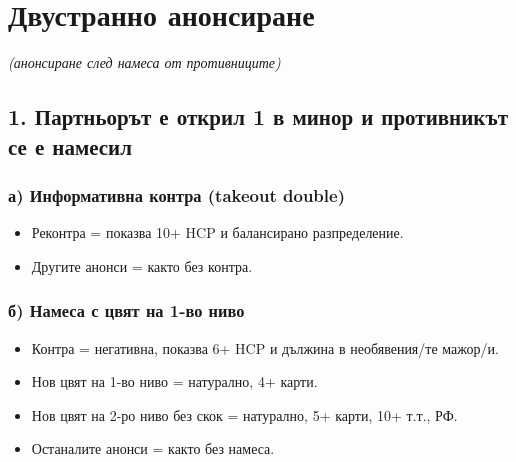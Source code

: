 \documentclass[10pt,a5paper]{extarticle}
\begin{document}


\section*{Двустранно анонсиране}
\textit{(анонсиране след намеса от противниците)}

\subsection*{1. Партньорът е открил 1 в минор и противникът се е намесил}

\subsubsection*{а) Информативна контра (takeout double)}
\begin{itemize}
    \item Реконтра = показва 10+ HCP и балансирано разпределение.
    \item Другите анонси = както без контра.
\end{itemize}

\subsubsection*{б) Намеса с цвят на 1-во ниво}
\begin{itemize}
    \item Контра = негативна, показва 6+ HCP и дължина в необявения/те мажор/и.
    \item Нов цвят на 1-во ниво = натурално, 4+ карти.
    \item Нов цвят на 2-ро ниво без скок = натурално, 5+ карти, 10+ т.т., РФ.
    \item Останалите анонси = както без намеса.
\end{itemize}
\end{document}
